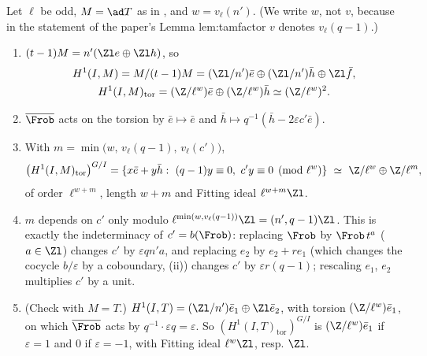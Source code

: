 \begin{proposition}\label{prop:cohomology:model}
Let $\ell$ be odd, $M=\ad T$ as in , and $w=v_\ell(n')$. (We write $w$, not $v$, because in the statement of the paper's Lemma
lem:tamfactor $v$ denotes $v_\ell(q-1)$.)
\begin{enumerate}[label=(\alph*)]
\item $(t-1)M=n'(\Zl e\oplus\Zl h)$, so
\begin{gather*}
H^1(I,M)=M/(t-1)M=(\Zl/n')\bar e\oplus(\Zl/n')\bar h\oplus\Zl\bar f,\\
H^1(I,M)_{\mathrm{tor}}=(\Z/\ell^w)\bar e\oplus(\Z/\ell^w)\bar h\simeq(\Z/\ell^w)^2 .
\end{gather*}
\item $\overline\Frob$ acts on the torsion by $\bar e\mapsto\bar e$ and $\bar h\mapsto q^{-1}(\bar h-2\varepsilon c'\bar e)$.
\item With $m=\min\bigl(w,\,v_\ell(q-1),\,v_\ell(c')\bigr)$,
\[
\bigl(H^1(I,M)_{\mathrm{tor}}\bigr)^{G/I}=\{x\bar e+y\bar h:\ (q-1)y\equiv0,\ c'y\equiv0\pmod{\ell^w}\}\ \simeq\ \Z/\ell^w\oplus\Z/\ell^m,
\]
of order $\ell^{w+m}$, length $w+m$ and Fitting ideal $\ell^{w+m}\Zl$.
\item $m$ depends on $c'$ only modulo $\ell^{\min(w,v_\ell(q-1))}\Zl=(n',q-1)\Zl$. This is exactly the indeterminacy of $c'=b(\Frob)$: replacing $\Frob$ by $\Frob\,t^a$ ($a\in\Zl$)
changes $c'$ by $\varepsilon qn'a$, and replacing $e_2$ by $e_2+re_1$ (which changes the cocycle $b/\varepsilon$ by a coboundary, (ii)) changes $c'$
by $\varepsilon r(q-1)$; rescaling $e_1$, $e_2$ multiplies $c'$ by a unit.
\item (Check with $M=T$.) $H^1(I,T)=(\Zl/n')\bar e_1\oplus\Zl\bar e_2$, with torsion $(\Z/\ell^w)\bar e_1$, on which $\overline\Frob$ acts by $q^{-1}\cdot\varepsilon q=\varepsilon$. So
$(H^1(I,T)_{\mathrm{tor}})^{G/I}$ is $(\Z/\ell^w)\bar e_1$ if $\varepsilon=1$ and $0$ if $\varepsilon=-1$, with Fitting ideal $\ell^w\Zl$, resp. $\Zl$.
\end{enumerate}
\end{proposition}

